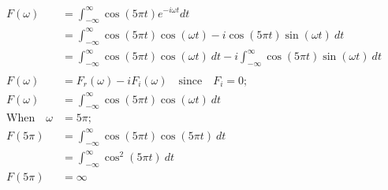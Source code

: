 \documentclass[preview]{standalone}
\begin{document}
\begin{align*}
F(\omega)&= \int_{-\infty}^{\infty} \cos{(5\pi t)}e^{-i\omega t} dt \\ &= \int_{-\infty}^{\infty} \cos{(5\pi t)}\cos{(\omega t)}-i\cos{(5\pi t)}\sin{(\omega t)} \ dt \\ &=\int_{-\infty}^{\infty} \cos{(5\pi t)}\cos{(\omega t)} \ dt - i\int_{-\infty}^{\infty} \cos{(5\pi t)}\sin{(\omega t)} \ dt \\ \\ F(\omega)&=F_{r}(\omega)-iF_{i}(\omega) \quad \textrm{since} \quad F_{i}=0 ; \\  F(\omega)&=\int_{-\infty}^{\infty} \cos{(5\pi t)}\cos{(\omega t)} \ dt \\  \textrm{When} \quad \omega&=5\pi ; \\ F(5\pi)&=\int_{-\infty}^{\infty} \cos{(5\pi t)}\cos{(5\pi t)} \ dt \\  &=\int_{-\infty}^{\infty} \cos^{2}{(5\pi t)} \ dt \\  F(5\pi)&=\infty
\end{align*}
\end{document}
